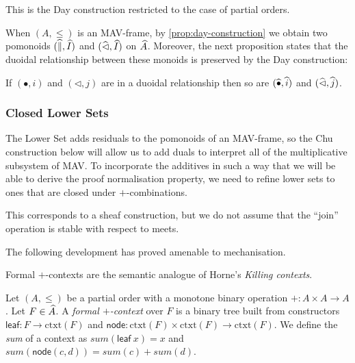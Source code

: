 \begin{remark}
  This is the Day construction \cite{day} restricted to the case of
  partial orders.
\end{remark}

\begin{remark}
  When $(A, \leq)$ is an MAV-frame, by \ref{prop:day-construction} we
  obtain two pomonoids $(\mathop{\widehat{\parallel}}, \mathop{\widehat{I}})$ and
  $(\mathop{\widehat{\lhd}}, \mathop{\widehat{I}})$ on $\widehat{A}$. Moreover, the next
  proposition states that the duoidal relationship between these
  monoids is preserved by the Day construction:
\end{remark}

\begin{proposition}\label{prop:lower-set-duoidal}
  If $(\bullet, i)$ and $(\lhd, j)$ are in a duoidal relationship then
  so are $(\mathop{\widehat{\bullet}}, \mathop{\widehat{i}})$ and $(\mathop{\widehat{\lhd}}, \mathop{\widehat{j}})$.
\end{proposition}

\subsubsection{Closed Lower Sets}

The Lower Set adds residuals to the pomonoids of an MAV-frame, so the
Chu construction below will allow us to add duals to interpret all of
the multiplicative subsystem of MAV. To incorporate the additives in
such a way that we will be able to derive the proof normalisation
property, we need to refine lower sets to ones that are closed under
$+$-combinations.

This corresponds to a sheaf construction, but we do not assume that
the ``join'' operation is stable with respect to meets.

The following development has proved amenable to mechanisation.

Formal $+$-contexts are the semantic analogue of Horne's \emph{Killing
  contexts}.

\begin{definition}
  Let $(A, \leq)$ be a partial order with a monotone binary operation
  $+ : A \times A \to A$.  Let $F \in \widehat{A}$. A \emph{formal
    $+$-context} over $F$ is a binary tree built from constructors
  $\mathsf{leaf} : F \to \mathrm{ctxt}(F)$ and
  $\mathsf{node} : \mathrm{ctxt}(F) \times \mathrm{ctxt}(F) \to
    \mathrm{ctxt}(F)$. We define the \emph{sum} of a context as
  $\mathit{sum}(\mathsf{leaf}~x) = x$ and
  $\mathit{sum}(\mathsf{node}(c,d)) = \mathit{sum}(c) +
    \mathit{sum}(d)$.
\end{definition}

